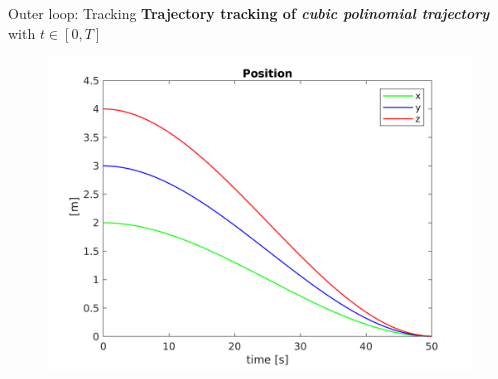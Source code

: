 \begin{frame}[fragile]{Outer loop: Tracking}
  \textbf{Trajectory tracking of \textsl{cubic polinomial trajectory}} with $t\in[0,T]$\\
	\begin{figure}[h]
	\centering
	\includegraphics[width=0.93\linewidth]{../report/Images/PositionOuter}
	\end{figure}
\end{frame}

